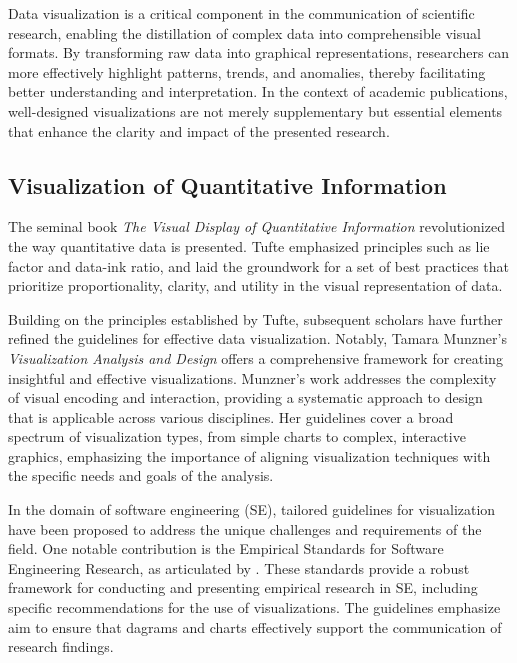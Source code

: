 \documentclass[
  10pt,
  conference,
]{IEEEtran}%
\begin{document}
Data visualization is a critical component in the communication of
scientific research, enabling the distillation of complex data into
comprehensible visual formats. By transforming raw data into graphical
representations, researchers can more effectively highlight patterns,
trends, and anomalies, thereby facilitating better understanding and
interpretation. In the context of academic publications, well-designed
visualizations are not merely supplementary but essential elements that
enhance the clarity and impact of the presented research.

\subsection{Visualization of Quantitative
Information}\label{visualization-of-quantitative-information}

The seminal book \emph{The Visual Display of Quantitative Information}
 revolutionized the way quantitative
data is presented. Tufte emphasized principles such as lie factor and
data-ink ratio, and laid the groundwork for a set of best practices that
prioritize proportionality, clarity, and utility in the visual
representation of data.

Building on the principles established by Tufte, subsequent scholars
have further refined the guidelines for effective data visualization.
Notably, Tamara Munzner's \emph{Visualization Analysis and Design}
 offers a comprehensive framework for
creating insightful and effective visualizations. Munzner's work
addresses the complexity of visual encoding and interaction, providing a
systematic approach to design that is applicable across various
disciplines. Her guidelines cover a broad spectrum of visualization
types, from simple charts to complex, interactive graphics, emphasizing
the importance of aligning visualization techniques with the specific
needs and goals of the analysis.

In the domain of software engineering (SE), tailored guidelines for
visualization have been proposed to address the unique challenges and
requirements of the field. One notable contribution is the Empirical
Standards for Software Engineering Research, as articulated by
. These standards provide a
robust framework for conducting and presenting empirical research in SE,
including specific recommendations for the use of visualizations. The
guidelines emphasize aim to ensure that dagrams and charts effectively
support the communication of research findings.
\end{document}
